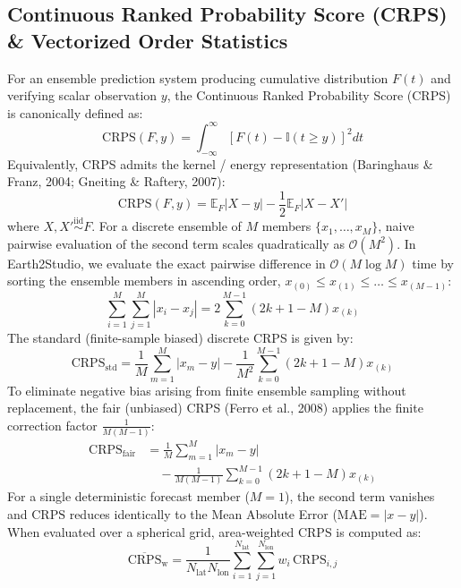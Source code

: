 \documentclass[10pt,twocolumn,letterpaper]{article}
\begin{document}
\subsection{Continuous Ranked Probability Score (CRPS) \& Vectorized Order Statistics}
For an ensemble prediction system producing cumulative distribution $F(t)$ and verifying scalar observation $y$, the Continuous Ranked Probability Score (CRPS)~\cite{hersbach2000decomposition,gneiting2007strictly} is canonically defined as:
\begin{equation}
\mathrm{CRPS}(F, y) = \int_{-\infty}^\infty \left[ F(t) - \mathbb{I}(t \ge y) \right]^2 dt
\label{eq:crps_cdf}
\end{equation}
Equivalently, CRPS admits the kernel / energy representation (Baringhaus \& Franz, 2004; Gneiting \& Raftery, 2007):
\begin{equation}
\mathrm{CRPS}(F, y) = \mathbb{E}_F|X - y| - \frac{1}{2}\mathbb{E}_F|X - X'|
\label{eq:crps_energy}
\end{equation}
where $X, X' \stackrel{\text{iid}}{\sim} F$. For a discrete ensemble of $M$ members $\{x_1, \dots, x_M\}$, naive pairwise evaluation of the second term scales quadratically as $\mathcal{O}(M^2)$. In Earth2Studio, we evaluate the exact pairwise difference in $\mathcal{O}(M \log M)$ time by sorting the ensemble members in ascending order, $x_{(0)} \le x_{(1)} \le \dots \le x_{(M-1)}$:
\begin{equation}
\sum_{i=1}^M \sum_{j=1}^M |x_i - x_j| = 2 \sum_{k=0}^{M-1} (2k + 1 - M) x_{(k)}
\label{eq:crps_order_stats}
\end{equation}
The standard (finite-sample biased) discrete CRPS is given by:
\begin{equation}
\mathrm{CRPS}_\mathrm{std} = \frac{1}{M}\sum_{m=1}^M |x_m - y| - \frac{1}{M^2}\sum_{k=0}^{M-1} (2k + 1 - M) x_{(k)}
\label{eq:crps_std}
\end{equation}
To eliminate negative bias arising from finite ensemble sampling without replacement, the fair (unbiased) CRPS (Ferro et al., 2008) applies the finite correction factor $\frac{1}{M(M-1)}$:
\begin{equation}
\begin{split}
\mathrm{CRPS}_\mathrm{fair} &= \frac{1}{M}\sum_{m=1}^M |x_m - y| \\
&\quad - \frac{1}{M(M-1)}\sum_{k=0}^{M-1} (2k + 1 - M) x_{(k)}
\end{split}
\label{eq:crps_fair}
\end{equation}
For a single deterministic forecast member ($M = 1$), the second term vanishes and $\mathrm{CRPS}$ reduces identically to the Mean Absolute Error ($\mathrm{MAE} = |x - y|$). When evaluated over a spherical grid, area-weighted CRPS is computed as:
\begin{equation}
\overline{\mathrm{CRPS}}_\mathrm{w} = \frac{1}{N_\mathrm{lat} N_\mathrm{lon}} \sum_{i=1}^{N_\mathrm{lat}} \sum_{j=1}^{N_\mathrm{lon}} w_i \, \mathrm{CRPS}_{i,j}
\end{equation}
\end{document}
